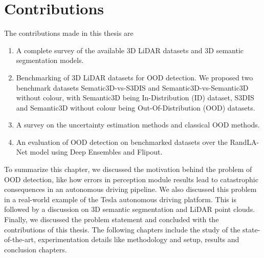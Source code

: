 \section{Contributions}
The contributions made in this thesis are
\begin{enumerate}
    \item A complete survey of the available 3D LiDAR datasets and 3D semantic segmentation models.
    \item Benchmarking of 3D LiDAR datasets for OOD detection. We proposed two benchmark datasets Sematic3D-vs-S3DIS and Semantic3D-vs-Semantic3D without colour, with Semantic3D being In-Distribution (ID) dataset, S3DIS and Semantic3D without colour being Out-Of-Distribution (OOD) datasets.
    \item A survey on the uncertainty estimation methods and classical OOD methods.
    \item An evaluation of OOD detection on benchmarked datasets over the RandLA-Net model using Deep Ensembles and Flipout.
\end{enumerate}

To summarize this chapter, we discussed the motivation behind the problem of OOD detection, like
how errors in perception module results lead to catastrophic consequences in an autonomous driving pipeline.
We also discussed this problem in a real-world example of the Tesla autonomous driving platform.
This is followed by a discussion on 3D semantic segmentation and LiDAR point clouds.
Finally, we discussed the problem statement and concluded with the contributions of this thesis.
The following chapters include the study of the state-of-the-art, experimentation details like methodology and setup, results and conclusion chapters.




